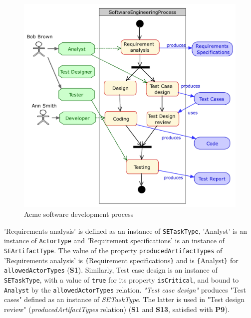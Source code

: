 \begin{figure}[t]
 \centering
    \includegraphics[width=1.0 \columnwidth]{Figures/SoftwareEngineeringProcessCroped.pdf}
     \caption{Acme software development process}
    \label{fig:AcmeSoftwareDevelopmentProcess}
\end{figure}


\textsf{'Requirements analysis'} is defined as an instance of \texttt{SETaskType}, \textsf{'Analyst'} is an instance of \texttt{ActorType} and \textsf{'Requirement specifications'} is an instance of \texttt{SEArtifactType}. The value of the property \texttt{producedArtifactTypes} of \textsf{'Requirements analysis'} is \texttt{\{}\textsf{Requirement specifications}\texttt{\}} and is \texttt{\{}\textsf{Analyst}\texttt{\}} for \texttt{allowedActorTypes} (\textbf{S1}). Similarly, \textsf{Test case design} is an instance of \texttt{SETaskType}, with a value of \texttt{true} for its property \texttt{isCritical}, and bound to \texttt{Analyst} by the \texttt{allowedActorTypes} relation. \textit{"Test case design"} produces \textsf{"Test cases"} defined as an instance of \textit{SETaskType}. The latter is used in "Test design review" (\textit{producedArtifactTypes} relation) (\textbf{S1} and \textbf{S13}, satisfied with \textbf{P9}). 

